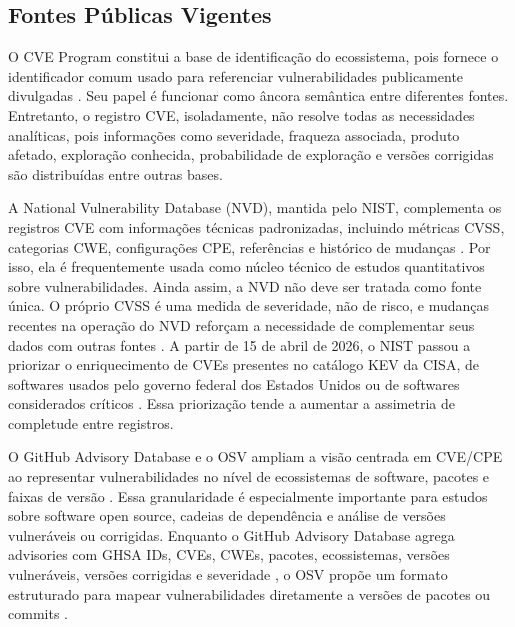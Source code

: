 \subsection{Fontes Públicas Vigentes}

O CVE Program constitui a base de identificação do ecossistema, pois fornece o identificador comum usado para referenciar vulnerabilidades publicamente divulgadas \cite{cve_program_overview}. Seu papel é funcionar como âncora semântica entre diferentes fontes. Entretanto, o registro CVE, isoladamente, não resolve todas as necessidades analíticas, pois informações como severidade, fraqueza associada, produto afetado, exploração conhecida, probabilidade de exploração e versões corrigidas são distribuídas entre outras bases.

A National Vulnerability Database (NVD), mantida pelo NIST, complementa os registros CVE com informações técnicas padronizadas, incluindo métricas CVSS, categorias CWE, configurações CPE, referências e histórico de mudanças \cite{nvd_home,first_cvss,mitre_cwe,nvd_cpe_dictionary}. Por isso, ela é frequentemente usada como núcleo técnico de estudos quantitativos sobre vulnerabilidades. Ainda assim, a NVD não deve ser tratada como fonte única. O próprio CVSS é uma medida de severidade, não de risco, e mudanças recentes na operação do NVD reforçam a necessidade de complementar seus dados com outras fontes \cite{nvd_cvss_metrics,nist_nvd_operations_2026}. A partir de 15 de abril de 2026, o NIST passou a priorizar o enriquecimento de CVEs presentes no catálogo KEV da CISA, de softwares usados pelo governo federal dos Estados Unidos ou de softwares considerados críticos \cite{nist_nvd_operations_2026}. Essa priorização tende a aumentar a assimetria de completude entre registros.

O GitHub Advisory Database e o OSV ampliam a visão centrada em CVE/CPE ao representar vulnerabilidades no nível de ecossistemas de software, pacotes e faixas de versão \cite{github_advisory_database_docs,github_advisory_database_repo,osv_database,osv_schema}. Essa granularidade é especialmente importante para estudos sobre software open source, cadeias de dependência e análise de versões vulneráveis ou corrigidas. Enquanto o GitHub Advisory Database agrega advisories com GHSA IDs, CVEs, CWEs, pacotes, ecossistemas, versões vulneráveis, versões corrigidas e severidade \cite{github_advisory_database_docs}, o OSV propõe um formato estruturado para mapear vulnerabilidades diretamente a versões de pacotes ou commits \cite{osv_schema}.

